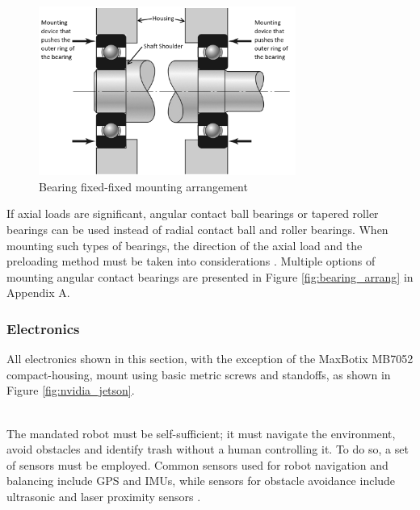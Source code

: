 \begin{figure}[H]
    \centering
    \includegraphics[width=0.75\textwidth]{Sections/LiteratureReview/img/Bearings/bearings_fix_fix.png}
    \caption{Bearing fixed-fixed mounting arrangement \cite{budynas_shigleys_2015}}
    \label{fig:bearing_fix-fix}
\end{figure}

If axial loads are significant, angular contact ball bearings or tapered roller bearings can be used instead of radial contact ball and roller bearings. When mounting such types of bearings, the direction of the axial load and the preloading method must be taken into considerations \cite{budynas_shigleys_2015}. Multiple options of mounting angular contact bearings are presented in Figure \ref{fig:bearing_arrang} in Appendix A.


\subsubsection{Electronics}

All electronics shown in this section, with the exception of the MaxBotix MB7052 compact-housing, mount using basic metric screws and standoffs, as shown in Figure \ref{fig:nvidia_jetson}.

 \mbox{}\\

The mandated robot must be self-sufficient; it must navigate the environment, avoid obstacles and identify trash without a human controlling it.
To do so, a set of sensors must be employed.
Common sensors used for robot navigation and balancing include GPS and IMUs, while sensors for obstacle avoidance include ultrasonic and laser proximity sensors \cite{corrigan_obstacle_2019}.


